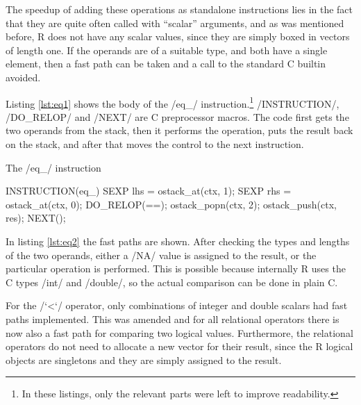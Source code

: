 The speedup of adding these operations as standalone instructions lies in the fact that they are quite often called with ``scalar'' arguments, and as was mentioned before, R does not have any scalar values, since they are simply boxed in vectors of length one. If the operands are of a suitable type, and both have a single element, then a fast path can be taken and a call to the standard C builtin avoided.

Listing \ref{lst:eq1} shows the body of the \cinline/eq_/ instruction.\footnote{In these listings, only the relevant parts were left to improve readability.} \cinline/INSTRUCTION/, \cinline/DO_RELOP/ and \cinline/NEXT/ are C preprocessor macros. The code first gets the two operands from the stack, then it performs the operation, puts the result back on the stack, and after that moves the control to the next instruction.

\begin{listing}[htbp]
  \caption{\label{lst:eq1}The \cinline/eq_/ instruction}
  \begin{ccode}
INSTRUCTION(eq_) {
    SEXP lhs = ostack_at(ctx, 1);
    SEXP rhs = ostack_at(ctx, 0);
    DO_RELOP(==);
    ostack_popn(ctx, 2);
    ostack_push(ctx, res);
    NEXT();
}
  \end{ccode}
\end{listing}

In listing \ref{lst:eq2} the fast paths are shown. After checking the types and lengths of the two operands, either a \rinline/NA/ value is assigned to the result, or the particular operation is performed. This is possible because internally R uses the C types \cinline/int/ and \cinline/double/, so the actual comparison can be done in plain C.

For the \rinline/`<`/ operator, only combinations of integer and double scalars had fast paths implemented. This was amended and for all relational operators there is now also a fast path for comparing two logical values. Furthermore, the relational operators do not need to allocate a new vector for their result, since the R logical objects are singletons and they are simply assigned to the result.

